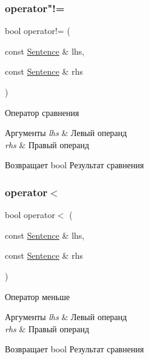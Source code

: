 \subsubsection{\texorpdfstring{operator"!=}{operator!=}}
{\footnotesize\ttfamily bool operator!= (\begin{DoxyParamCaption}\item[{const \hyperlink{classJarvis_1_1Sentence}{Sentence} \&}]{lhs,  }\item[{const \hyperlink{classJarvis_1_1Sentence}{Sentence} \&}]{rhs }\end{DoxyParamCaption})\hspace{0.3cm}{\ttfamily [friend]}}



Оператор сравнения 


\begin{DoxyParams}{Аргументы}
{\em lhs} & Левый операнд \\
\hline
{\em rhs} & Правый операнд \\
\hline
\end{DoxyParams}
\begin{DoxyReturn}{Возвращает}
bool Результат сравнения 
\end{DoxyReturn}
\mbox{\label{classJarvis_1_1Sentence_ad8bc9f0888e1331f783f7a8e1765403f}} 
\subsubsection{\texorpdfstring{operator$<$}{operator<}}
{\footnotesize\ttfamily bool operator$<$ (\begin{DoxyParamCaption}\item[{const \hyperlink{classJarvis_1_1Sentence}{Sentence} \&}]{lhs,  }\item[{const \hyperlink{classJarvis_1_1Sentence}{Sentence} \&}]{rhs }\end{DoxyParamCaption})\hspace{0.3cm}{\ttfamily [friend]}}



Оператор меньше 


\begin{DoxyParams}{Аргументы}
{\em lhs} & Левый операнд \\
\hline
{\em rhs} & Правый операнд \\
\hline
\end{DoxyParams}
\begin{DoxyReturn}{Возвращает}
bool Результат сравнения 
\end{DoxyReturn}
\mbox{\label{classJarvis_1_1Sentence_af9d0c048412448422e8af2e420a0be48}} 
